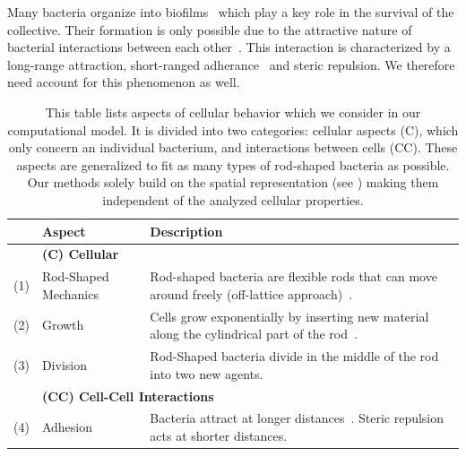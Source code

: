 \documentclass[10pt,letterpaper]{article}
\begin{document}
Many bacteria organize into biofilms~\cite{Dunne2002,Ong1999} which play a key role in the survival
of the collective.
Their formation is only possible due to the attractive nature of bacterial interactions between
each other~\cite{Berne2018}.
This interaction is characterized by a long-range attraction, short-ranged
adherance~\cite{Verwey1947,Trejo2013} and steric repulsion.
We therefore need account for this phenomenon as well.

\begin{table}[H]
    \centering
    \def\arraystretch{1.3}
    \begin{tabularx}{\textwidth}{c l X}
        &\textbf{Aspect} & \textbf{Description}\\
        \toprule
        &\multicolumn{2}{l}{\textbf{(C) Cellular}}\\
        \midrule
        (1) & Rod-Shaped Mechanics &
            Rod-shaped bacteria are flexible rods that can move around freely (off-lattice
            approach)~\cite{Takeuchi2005,Ursell2014,Amir2014_2}.\\
        (2) & Growth &
            Cells grow exponentially by inserting new material along the cylindrical part of the
            rod~\cite{Robert2014,Takeuchi2005}.\\
        (3) & Division &
            Rod-Shaped bacteria divide in the middle of the rod into two new agents.\\
        &\multicolumn{2}{l}{\textbf{(CC) Cell-Cell Interactions}}\\
        \midrule
        (4) & Adhesion &
            Bacteria attract at longer distances~\cite{Verwey1947,Trejo2013}.
            Steric repulsion acts at shorter distances.\\
        \bottomrule
    \end{tabularx}
    \caption{
        This table lists aspects of cellular behavior which we consider in our computational model.
        It is divided into two categories: cellular aspects (C), which only concern an individual
        bacterium, and interactions between cells (CC).
        These aspects are generalized to fit as many types of rod-shaped bacteria as possible.
        Our methods solely build on the spatial representation (see
        ) making them independent of the analyzed cellular
        properties.
    }
    \label{table:simulation-aspects}
\end{table}

\end{document}
